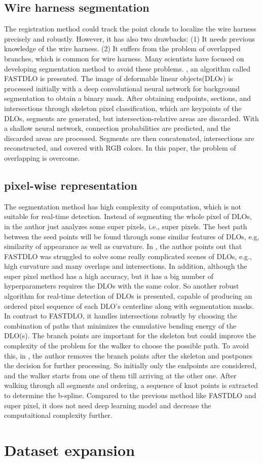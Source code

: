 \subsection{Wire harness segmentation}
    The registration method could track the point clouds to localize the wire harness precisely and robustly. However, it has also two drawbacks: (1) It needs previous knowledge of the 
    wire harness. (2) It suffers from the problem of overlapped branches, which is common for wire harness. Many scientists have focused on developing segmentation method to avoid these 
    problems. \cite{Caporali2022}, an algorithm called FASTDLO is presented. The image of deformable linear objects(DLOs) is processed initially with a deep convolutional neural network for background segmentation 
    to obtain a binary mask. After obtaining endpoints, sections, and intersections through skeleton pixel classification, which are keypoints of the DLOs, segments are generated, 
    but intersection-relative areas are discarded. With a shallow neural network, connection probabilities are predicted, and the discarded areas are processed. Segments are then 
    concatenated, intersections are reconstructed, and covered with RGB colors. In this paper, the problem of overlapping is overcome.
\subsection{pixel-wise representation}
    The segmentation method has high complexity of computation, which is not suitable for real-time detection. Instead of segmenting the whole pixel of DLOs, in \cite{degregorio2018lets}
    the author just analyzes some super pixels, i.e., super pixels. The best path between the seed points will be found through some similar features of DLOs, e.g, similarity of appearance as well as 
    curvature. 
    In \cite{10167643}, the author points out that FASTDLO
    was struggled to solve some really complicated scenes of DLOs, e.g., high curvature and many overlaps and intersections. In addition, although the super pixel method has a 
    high accuracy, but it has a big number of hyperparameters requires the DLOs with the same color. So another robust algorithm 
    for real-time detection of DLOs is presented, capable of producing an ordered pixel sequence of each DLO’s centerline along with segmentation masks. In contrast to FASTDLO, it 
    handles intersections robustly by choosing the combination of paths that minimizes the cumulative bending energy of the DLO(s). The branch points are important for the skeleton 
    but could improve the complexity of the problem for the walker to choose the possible path.  To avoid this, in \cite{10160437}, the author removes 
    the branch points after the skeleton and postpones the decision for further processing. So initially only the endpoints are considered, and the walker starts from one 
    of them till arriving at the other one. After walking through all segments and ordering, a sequence of knot points is extracted to determine the b-spline. Compared to the previous 
    method like FASTDLO and super pixel, it does not need deep learning model and decrease the computaitional complexity further. 
\section{Dataset expansion}

